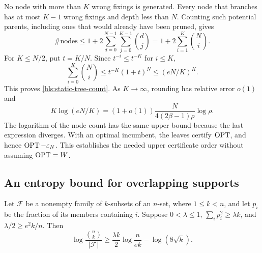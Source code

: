 No node with more than $K$ wrong fixings is generated.  Every node that
branches has at most $K-1$ wrong fixings and depth less than $N$.
Counting such potential parents, including ones that would already have
been pruned, gives
\[
 \#\text{nodes}\le
 1+2\sum_{d=0}^{N-1}\sum_{j=0}^{K-1}\binom dj
 =1+2\sum_{i=1}^K\binom Ni.
\]
For $K\le N/2$, put $t=K/N$.  Since $t^{-i}\le t^{-K}$ for $i\le K$,
\[
 \sum_{i=0}^K\binom Ni
 \le t^{-K}(1+t)^N\le(eN/K)^K.
\]
This proves \eqref{bls:static-tree-count}.  As $K\to\infty$,
rounding has relative error $o(1)$ and
\[
 K\log(eN/K)
 =(1+o(1))\frac{N}{4(2\beta-1)\rho}\log\rho.
\]
The logarithm of the node count has the same upper bound because the
last expression diverges.  With an optimal incumbent, the leaves certify
$\operatorname{OPT}$, and hence $\operatorname{OPT}-\varepsilon_N$.  This establishes the needed
upper certificate order without assuming $\operatorname{OPT}=W$.

\subsection{An entropy bound for overlapping supports}
\label{app:bls-entropy-proof}

\begin{lemma}
\label{app:bls-overlap-entropy}
Let $\mathcal F$ be a nonempty family of $k$-subsets of an $n$-set, where
$1\le k<n$, and let $p_i$ be the fraction of its members containing $i$.
Suppose $0<\lambda\le1$,
$\sum_i p_i^2\ge\lambda k$, and
$\lambda/2\ge e^2k/n$.  Then
\begin{equation}
 \log\frac{\binom nk}{|\mathcal F|}
 \ge\frac{\lambda k}{2}\log\frac n{ek}-\log(8\sqrt k).
 \label{app:bls-entropy-loss}
\end{equation}
\end{lemma}

